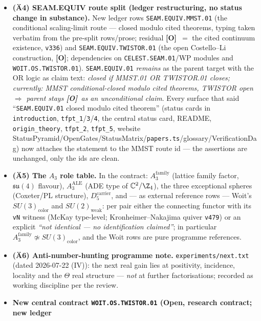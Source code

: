 \documentclass[11pt]{article}
\providecommand{\mO}{\textbf{[O]}}\providecommand{\mX}{\textbf{[X]}}
\begin{document}
\begin{itemize}[leftmargin=1.5em]
(arithmetic) or \mO\ (quantisation question); ``$\mathbb{PT}/\Z_4$'' is defined once for the whole
contract (quotient by $\Gamma_{\mathrm{ALE}}$, normalised by $\langle\rho\rangle$) with a
cross-reference sentence in \texttt{tfpt\_3}.
\item \textbf{(\"A4) SEAM.EQUIV route split (ledger restructuring, no status change in substance).}
New ledger rows \texttt{SEAM.EQUIV.MMST.01} (the conditional scaling-limit route --- closed modulo
cited theorems, typing taken verbatim from the pre-split rows/prose; residual \mO\ $=$ the cited
continuum existence, \texttt{v336}) and \texttt{SEAM.EQUIV.TWISTOR.01} (the open Costello--Li
construction, \mO; dependencies on \texttt{CELEST.SEAM.01}/WP modules and
\texttt{WOIT.OS.TWISTOR.01}). \texttt{SEAM.EQUIV.01} \emph{remains} as the parent target with the OR
logic as claim text: \emph{closed if MMST.01 OR TWISTOR.01 closes; currently: MMST
conditional-closed modulo cited theorems, TWISTOR open $\Rightarrow$ parent stays \mO\ as an
unconditional claim}. Every surface that said ``\texttt{SEAM.EQUIV.01} closed modulo cited
theorem'' (status cards in \texttt{introduction}, \texttt{tfpt\_1}/\texttt{3}/\texttt{4}, the
central status card, README, \texttt{origin\_theory}, \texttt{tfpt\_2}, \texttt{tfpt\_5}, website
StatusPyramid/OpenGates/StatusMatrix/\texttt{papers.ts}/glossary/VerificationDag) now attaches the
statement to the MMST route id --- the assertions are unchanged, only the ids are clean.
\item \textbf{(\"A5) The $A_3$ role table.} In the contract: $A_3^{\mathrm{family}}$ (lattice family
factor, $\mathfrak{su}(4)$ flavour), $A_3^{\mathrm{ALE}}$ (ADE type of $\mathbb C^2/\Z_4$), the
three exceptional spheres (Coxeter/PL structure), $D_5^{\mathrm{carrier}}$, and --- as external
reference rows --- Woit's $SU(3)_{\mathrm{color}}$ and $SU(2)_{\mathrm{weak}}$: per pair either the
connecting functor with its \texttt{vN} witness (McKay type-level; Kronheimer--Nakajima quiver
\texttt{v479}) or an explicit \emph{``not identical --- no identification claimed''}; in particular
$A_3^{\mathrm{family}}\not\simeq SU(3)_{\mathrm{color}}$, and the Woit rows are pure programme
references.
\item \textbf{(\"A6) Anti-number-hunting programme note.} \texttt{experiments/next.txt} (dated
2026-07-22 (IV)): the next real gain lies at positivity, incidence, locality and the $\Theta$ real
structure --- \emph{not} at further factorisations; recorded as working discipline per the review.
\item \textbf{New central contract \texttt{WOIT.OS.TWISTOR.01} (Open, research contract; new ledger
}
\end{itemize}
\end{document}
